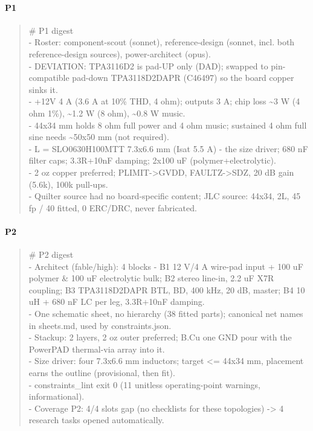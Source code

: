 \documentclass[11pt]{article}
\begin{document}
\paragraph*{P1}
\begin{quote}\small\ttfamily\raggedright
\# P1 digest\\
- Roster: component-scout (sonnet), reference-design (sonnet, incl. both reference-design sources), power-architect (opus).\\
- DEVIATION: TPA3116D2 is pad-UP only (DAD); swapped to pin-compatible pad-down TPA3118D2DAPR (C46497) so the board copper sinks it.\\
- +12V 4 A (3.6 A at 10\% THD, 4 ohm); outputs 3 A; chip loss \textasciitilde{}3 W (4 ohm 1\%), \textasciitilde{}1.2 W (8 ohm), \textasciitilde{}0.8 W music.\\
- 44x34 mm holds 8 ohm full power and 4 ohm music; sustained 4 ohm full sine needs \textasciitilde{}50x50 mm (not required).\\
- L = SLO0630H100MTT 7.3x6.6 mm (Isat 5.5 A) - the size driver; 680 nF filter caps; 3.3R+10nF damping; 2x100 uF (polymer+electrolytic).\\
- 2 oz copper preferred; PLIMIT-\textgreater{}GVDD, FAULTZ-\textgreater{}SDZ, 20 dB gain (5.6k), 100k pull-ups.\\
- Quilter source had no board-specific content; JLC source: 44x34, 2L, 45 fp / 40 fitted, 0 ERC/DRC, never fabricated.
\end{quote}
\paragraph*{P2}
\begin{quote}\small\ttfamily\raggedright
\# P2 digest\\
- Architect (fable/high): 4 blocks - B1 12 V/4 A wire-pad input + 100 uF polymer \& 100 uF electrolytic bulk; B2 stereo line-in, 2.2 uF X7R coupling; B3 TPA3118D2DAPR BTL, BD, 400 kHz, 20 dB, master; B4 10 uH + 680 nF LC per leg, 3.3R+10nF damping.\\
- One schematic sheet, no hierarchy (38 fitted parts); canonical net names in sheets.md, used by constraints.json.\\
- Stackup: 2 layers, 2 oz outer preferred; B.Cu one GND pour with the PowerPAD thermal-via array into it.\\
- Size driver: four 7.3x6.6 mm inductors; target \textless{}= 44x34 mm, placement earns the outline (provisional, then fit).\\
- constraints\_lint exit 0 (11 unitless operating-point warnings, informational).\\
- Coverage P2: 4/4 slots gap (no checklists for these topologies) -\textgreater{} 4 research tasks opened automatically.
\end{quote}
\end{document}

